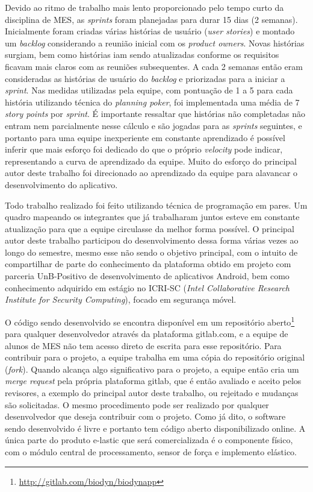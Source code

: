 Devido ao ritmo de trabalho mais lento proporcionado pelo tempo curto da disciplina de MES, as \textit{sprints} foram planejadas para durar 15 dias (2 semanas). Inicialmente foram criadas várias histórias de usuário (\textit{user stories}) e montado um \textit{backlog} considerando a reunião inicial com os \textit{product owners}. Novas histórias surgiam, bem como histórias iam sendo atualizadas conforme os requisitos ficavam mais claros com as reuniões subsequentes. A cada 2 semanas então eram consideradas as histórias de usuário do \textit{backlog} e priorizadas para a iniciar a \textit{sprint}. Nas medidas utilizadas pela equipe, com pontuação de 1 a 5 para cada história utilizando técnica do \textit{planning poker}, foi implementada uma média de 7 \textit{story points} por \textit{sprint}. É importante ressaltar que histórias não completadas não entram nem parcialmente nesse cálculo e são jogadas para as \textit{sprints} seguintes, e portanto para uma equipe inexperiente em constante aprendizado é possível inferir que mais esforço foi dedicado do que o próprio \textit{velocity} pode indicar, representando a curva de aprendizado da equipe. Muito do esforço do principal autor deste trabalho foi direcionado ao aprendizado da equipe para alavancar o desenvolvimento do aplicativo.

Todo trabalho realizado foi feito utilizando técnica de programação em pares. Um quadro mapeando os integrantes que já trabalharam juntos esteve em constante atualização para que a equipe circulasse da melhor forma possível. O principal autor deste trabalho participou do desenvolvimento dessa forma várias vezes ao longo do semestre, mesmo esse não sendo o objetivo principal, com o intuito de compartilhar de parte do conhecimento da plataforma obtido em projeto com parceria UnB-Positivo de desenvolvimento de aplicativos Android, bem como conhecimento adquirido em estágio no ICRI-SC (\textit{Intel Collaborative Research Institute for Security Computing}), focado em segurança móvel.

O código sendo desenvolvido se encontra disponível em um repositório aberto\footnote{\url{http://gitlab.com/biodyn/biodynapp}} para qualquer desenvolvedor através da plataforma gitlab.com, e a equipe de alunos de MES não tem acesso direto de escrita para esse repositório. Para contribuir para o projeto, a equipe trabalha em uma cópia do repositório original (\textit{fork}). Quando alcança algo significativo para o projeto, a equipe então cria um \textit{merge request} pela própria plataforma gitlab, que é então avaliado e aceito pelos revisores, a exemplo do principal autor deste trabalho, ou rejeitado e mudanças são solicitadas. O mesmo procedimento pode ser realizado por qualquer desenvolvedor que deseja contribuir com o projeto. Como já dito, o software sendo desenvolvido é livre e portanto tem código aberto disponibilizado online. A única parte do produto e-lastic que será comercializada é o componente físico, com o módulo central de processamento, sensor de força e implemento elástico.

